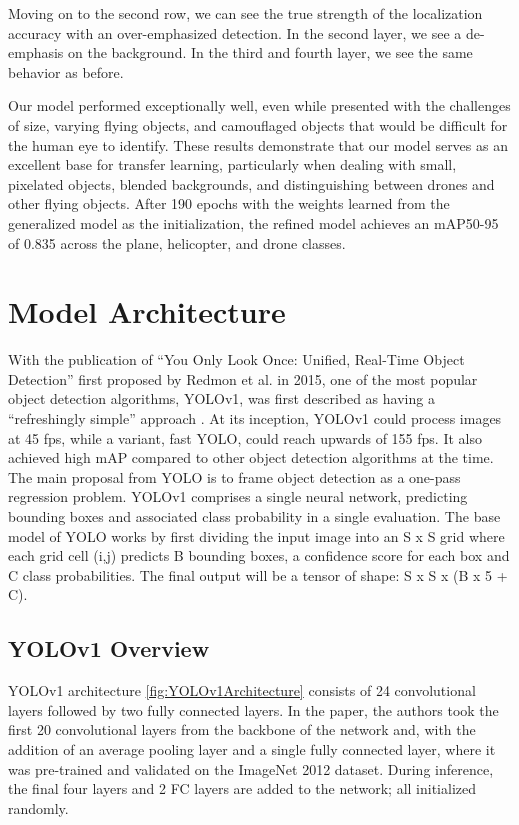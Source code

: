 \documentclass[10pt,twocolumn,letterpaper]{article}
\begin{document}
Moving on to the second row, we can see the true strength of the localization accuracy with an over-emphasized detection. In the second layer, we see a de-emphasis on the background. In the third and fourth layer, we see the same behavior as before.

Our model performed exceptionally well, even while presented with the challenges of size, varying flying objects, and camouflaged objects that would be difficult for the human eye to identify. These results demonstrate that our model serves as an excellent base for transfer learning, particularly when dealing with small, pixelated objects, blended backgrounds, and distinguishing between drones and other flying objects. After 190 epochs with the weights learned from the generalized model as the initialization, the refined model achieves an mAP50-95 of 0.835 across the plane, helicopter, and drone classes.

\section{Model Architecture}
With the publication of “You Only Look Once: Unified, Real-Time Object Detection” first proposed by Redmon et al.\cite{YOLO_OG} in 2015, one of the most popular object detection algorithms, YOLOv1, was first described as having a “refreshingly simple” approach \cite{CompReview}. At its inception, YOLOv1 could process images at 45 fps, while a variant, fast YOLO, could reach upwards of 155 fps. It also achieved high mAP compared to other object detection algorithms at the time.\\
\indent The main proposal from YOLO is to frame object detection as a one-pass regression problem. YOLOv1 comprises a single neural network, predicting bounding boxes and associated class probability in a single evaluation. The base model of YOLO works by first dividing the input image into an S x S grid where each grid cell (i,j) predicts B bounding boxes, a confidence score for each box and C class probabilities. The final output will be a tensor of shape: S x S x (B x 5 + C).

\subsection{YOLOv1 Overview}
YOLOv1 architecture \ref{fig:YOLOv1Architecture} consists of 24 convolutional layers followed by two fully connected layers. In the paper, the authors took the first 20 convolutional layers from the backbone of the network and, with the addition of an average pooling layer and a single fully connected layer, where it was pre-trained and validated on the ImageNet 2012 dataset. During inference, the final four layers and 2 FC layers are added to the network; all initialized randomly.
\end{document}
